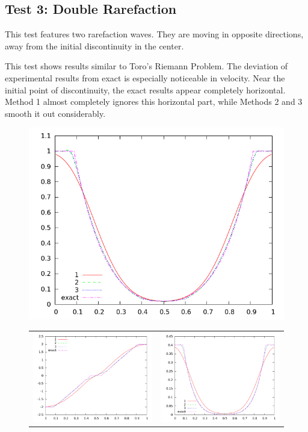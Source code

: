 \documentclass[10pt]{article}
\begin{document}
\clearpage

\subsection{Test 3: Double Rarefaction}
This test features two rarefaction waves. They are moving in opposite directions, away from the initial discontinuity in the center. 

This test shows results similar to Toro's Riemann Problem. The deviation of experimental results from exact is especially noticeable in velocity. Near the initial point of discontinuity, the exact results appear completely horizontal. Method 1 almost completely ignores this horizontal part, while Methods 2 and 3 smooth it out considerably. 
\begin{figure}[h]
  \begin{center}
     \includegraphics[width=.95\textwidth]{den_T3.png}	
	\begin{tabular}{cc}
      \includegraphics[width=.475\textwidth]{vel_T3.png} &
	  \includegraphics[width=.475\textwidth]{prs_T3.png}

\end{tabular}
\end{center}
\end{figure}
\end{document}

